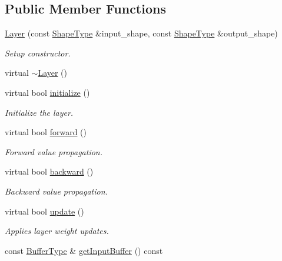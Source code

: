 \subsection*{Public Member Functions}
\begin{DoxyCompactItemize}
\item 
\hyperlink{classffnn_1_1layer_1_1_layer_a0c766a6f5770ea0ae8a7e660523eb413}{Layer} (const \hyperlink{classffnn_1_1layer_1_1internal_1_1_interface_a945709b1d0ea54a51539b80d04485f5f}{Shape\-Type} \&input\-\_\-shape, const \hyperlink{classffnn_1_1layer_1_1internal_1_1_interface_a945709b1d0ea54a51539b80d04485f5f}{Shape\-Type} \&output\-\_\-shape)
\begin{DoxyCompactList}\small\item\em Setup constructor. \end{DoxyCompactList}\item 
virtual \hyperlink{classffnn_1_1layer_1_1_layer_aa466bcb2ac40d059e9b6e40be157d1b4}{$\sim$\-Layer} ()
\item 
virtual bool \hyperlink{classffnn_1_1layer_1_1_layer_ae8a7daa81382a7965b8ab8861da7e522}{initialize} ()
\begin{DoxyCompactList}\small\item\em Initialize the layer. \end{DoxyCompactList}\item 
virtual bool \hyperlink{classffnn_1_1layer_1_1_layer_a832518de9beb442be0764e49ab24d78d}{forward} ()
\begin{DoxyCompactList}\small\item\em Forward value propagation. \end{DoxyCompactList}\item 
virtual bool \hyperlink{classffnn_1_1layer_1_1_layer_a59d5f45393a1b0e4673969c65faaae2a}{backward} ()
\begin{DoxyCompactList}\small\item\em Backward value propagation. \end{DoxyCompactList}\item 
virtual bool \hyperlink{classffnn_1_1layer_1_1_layer_a25bf06cfea93baf1c80e21d0a88a5e4a}{update} ()
\begin{DoxyCompactList}\small\item\em Applies layer weight updates. \end{DoxyCompactList}\item 
const \hyperlink{classffnn_1_1layer_1_1_layer_a3f2e9c375d9bcf80e6000e9e53ba212d}{Buffer\-Type} \& \hyperlink{classffnn_1_1layer_1_1_layer_a8049c939bc452bd5453227d1ce1a35f3}{get\-Input\-Buffer} () const 

\end{DoxyCompactItemize}
